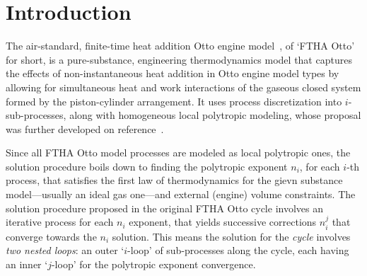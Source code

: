 \section{Introduction}

    The air-standard, finite-time heat addition Otto engine model~\cite{2017-NaaktgeborenC-IntJMechEngEduc}, of `FTHA Otto'  for
    short, is a pure-substance, engineering thermodynamics model that captures the effects of non-instantaneous heat addition in
    Otto engine model types by allowing for simultaneous heat and work interactions of the gaseous closed system formed  by  the
    piston-cylinder arrangement. It uses process discretization into $i$-sub-processes, along with homogeneous local  polytropic
    modeling, whose proposal was further developed on reference~\cite{2020-NaaktgeborenC-Polytropic-engrXiv-rev02}.

    Since all FTHA Otto model processes are modeled as local polytropic ones, the solution procedure boils down to  finding  the
    polytropic exponent $n_i$, for each $i$-th process, that satisfies the first law of thermodynamics for the  gievn  substance
    model---usually an ideal gas one---and external (engine) volume constraints. The solution procedure proposed in the original
    FTHA Otto cycle involves an iterative process for each $n_i$ exponent,  that  yields  successive  corrections  $n_i^j$  that
    converge towards the $n_i$ solution. This means the solution for the \emph{cycle} involves \emph{two nested loops}: an outer
    `$i$-loop' of sub-processes along the cycle, each having an inner `$j$-loop' for the polytropic exponent convergence.

    


